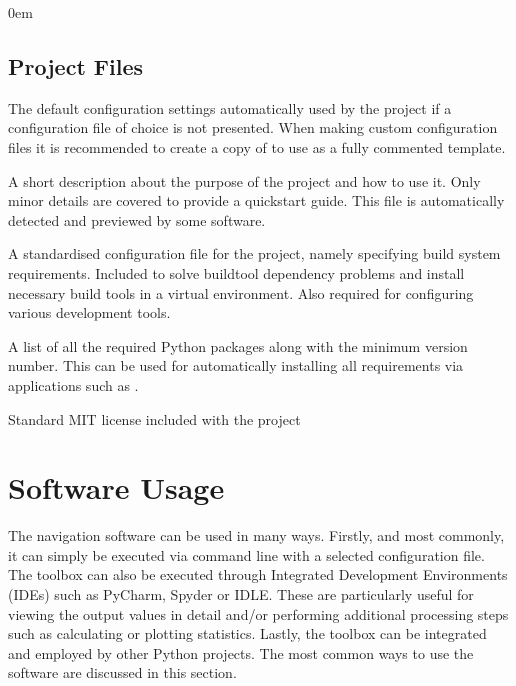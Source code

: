 \documentclass[letterpaper,10pt,english]{sphinxmanual}
\begin{document}
\begin{DUlineblock}{0em}
\item[] 
\end{DUlineblock}


\subsection{Project Files}
\label{\detokenize{usage/structure:project-files}}\begin{description}
\sphinxAtStartPar
The default configuration settings automatically used by the project if a configuration file of choice is not
presented. When making custom configuration files it is recommended to create a copy of 
to use as a fully commented template.

\sphinxAtStartPar
A short description about the purpose of the project and how to use it. Only minor details are covered to provide
a quick\sphinxhyphen{}start guide. This file is automatically detected and previewed by some software.

\sphinxAtStartPar
A standardised configuration file for the project, namely specifying build system requirements. Included to solve
build\sphinxhyphen{}tool dependency problems and install necessary build tools in a virtual environment. Also required for
configuring various development tools.

\sphinxAtStartPar
A list of all the required Python packages along with the minimum version number. This can be used for
automatically installing all requirements via applications such as .

\sphinxAtStartPar
Standard MIT license included with the project

\end{description}

\sphinxstepscope


\section{Software Usage}
\label{\detokenize{usage/execution:software-usage}}\label{\detokenize{usage/execution::doc}}
\sphinxAtStartPar
The navigation software can be used in many ways. Firstly, and most commonly, it can simply be executed via command
line with a selected configuration file. The toolbox can also be executed through Integrated Development Environments
(IDEs) such as PyCharm, Spyder or IDLE. These are particularly useful for viewing the output values in detail and/or
performing additional processing steps such as calculating or plotting statistics. Lastly, the toolbox can be
integrated and employed by other Python projects. The most common ways to use the software are discussed
in this section.
\end{document}
